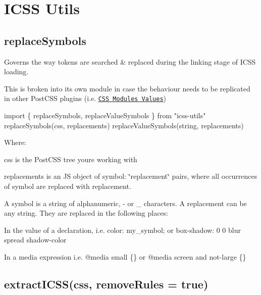 \href{https://travis-ci.org/css-modules/icss-utils}{\tt }

\section*{I\+C\+SS Utils}

\subsection*{replace\+Symbols}

Governs the way tokens are searched \& replaced during the linking stage of I\+C\+SS loading.

This is broken into its own module in case the behaviour needs to be replicated in other Post\+C\+SS plugins (i.\+e. \href{https://github.com/css-modules/postcss-modules-values}{\tt C\+SS Modules Values})


\begin{DoxyCode}
import \{ replaceSymbols, replaceValueSymbols \} from "icss-utils"
replaceSymbols(css, replacements)
replaceValueSymbols(string, replacements)
\end{DoxyCode}


Where\+:


\begin{DoxyItemize}
\item {\ttfamily css} is the Post\+C\+SS tree you\textquotesingle{}re working with
\item {\ttfamily replacements} is an JS object of {\ttfamily symbol\+: \char`\"{}replacement\char`\"{}} pairs, where all occurrences of {\ttfamily symbol} are replaced with {\ttfamily replacement}.
\end{DoxyItemize}

A symbol is a string of alphanumeric, {\ttfamily -\/} or {\ttfamily \+\_\+} characters. A replacement can be any string. They are replaced in the following places\+:


\begin{DoxyItemize}
\item In the value of a declaration, i.\+e. {\ttfamily color\+: my\+\_\+symbol;} or {\ttfamily box-\/shadow\+: 0 0 blur spread shadow-\/color}
\item In a media expression i.\+e. {\ttfamily @media small \{\}} or {\ttfamily @media screen and not-\/large \{\}}
\end{DoxyItemize}

\subsection*{extract\+I\+C\+SS(css, remove\+Rules = true)}

